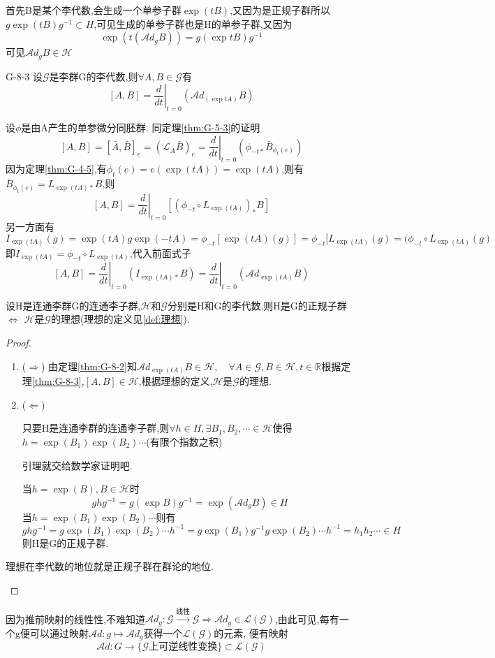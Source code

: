 \documentclass[../main.tex]{subfiles}
\begin{document}
首先B是某个李代数,会生成一个单参子群$\exp(tB)$,又因为是正规子群所以$g\exp(tB)g^{-1}\subset H$,可见生成的单参子群也是H的单参子群,又因为$$
	\exp(t (\mathscr{A}\!d_g B)) = g(\exp tB)g^{-1}$$
可见$\mathscr{A}\!d_gB \in \mathscr{H}$
\begin{theorem}{}{G-8-3}
	设$\mathscr{G}$是李群G的李代数,则$\forall A,B \in \mathscr{G}$有$$
		[A,B] = \left.\frac{d}{dt}\right|_{t=0} (\mathscr{A}\!d_{(\exp tA)}B)$$
\end{theorem}
设$\phi$是由A产生的单参微分同胚群.
同定理\ref{thm:G-5-3}的证明$$
	[A,B] = [\bar{A},\bar{B}]_e = (\mathscr{L}_{\bar{A}}\bar{B})_e = \left.\frac{d}{dt}\right|_{t=0}(\phi_{-t*}\bar{B}_{\phi_{t}(e)})$$
因为定理\ref{thm:G-4-5},有$\phi_t(e) = e (\exp(tA)) = \exp(tA)$,则有$\bar{B}_{\phi_t(e)} = L_{\exp(tA)*}B$,则$$
	[A,B] = \left.\frac{d}{dt}\right|_{t=0}[(\phi_{-t} \circ L_{\exp(tA)})_{*}B]$$
另一方面有$$
	I_{\exp (tA)}(g) = \exp(tA) g \exp(-tA) = \phi_{-t}[\exp (tA)(g)] = \phi_{-t}[L_{\exp(tA)}(g) = (\phi_{-t}\circ L_{\exp(tA)}(g)$$
即$I_{\exp(tA)} = \phi_{-t}\circ L_{\exp (tA)}$,代入前面式子$$
	[A,B] = \left.\frac{d}{dt}\right|_{t=0}(I_{\exp(tA)*}B) = \left.\frac{d}{dt}\right|_{t=0}(\mathscr{A}\!d_{\exp(tA)}B)$$
\begin{theorem}
	设H是连通李群G的连通李子群,$\mathscr{H}$和$\mathscr{G}$分别是H和G的李代数,则H是G的正规子群$\Leftrightarrow$ $\mathscr{H}$是$\mathscr{G}$的理想(理想的定义见\ref{def:理想}).
\end{theorem}
\begin{proof}
	\begin{enumerate}
		\item ($\Rightarrow$) 由定理\ref{thm:G-8-2}知$\mathscr{A}\!d_{\exp(tA)}B \in \mathscr{H},\quad \forall A \in \mathscr{G} ,B\in \mathscr{H}, t \in \mathbb{R}$根据定理\ref{thm:G-8-3},$[A,B] \in \mathscr{H}$,根据理想的定义,$\mathscr{H}$是$\mathscr{G}$的理想.
		\item ($\Leftarrow$) \begin{lemma}
			      只要H是连通李群的连通李子群,则$\forall h \in H,\exists B_1,B_2,\cdots \in \mathscr{H}$使得$h = \exp(B_1)\exp(B_2)\cdots$(有限个指数之积)
		      \end{lemma}引理就交给数学家证明吧.

		      当$h = \exp(B),B\in \mathscr{H}$时$$
			      ghg^{-1} = g(\exp{B})g^{-1} = \exp(\mathscr{A}\!d_gB) \in H$$当$h = \exp(B_1) \exp(B_2) \cdots$则有$$
			      ghg^{-1} = g\exp(B_1) \exp(B_2)\cdots h^{-1} = g\exp(B_1) g^{-1}g\exp(B_2)\cdots h^{-1} = h_1 h_2 \cdots \in H$$则H是G的正规子群.
	\end{enumerate}
	\begin{note}
		理想在李代数的地位就是正规子群在群论的地位.
	\end{note}
\end{proof}
因为推前映射的线性性,不难知道$\mathscr{A}\!d_g:\mathscr{G}\xrightarrow{\text{线性}} \mathscr{G} \Rightarrow \mathscr{A}\!d_g\in \mathscr{L}(\mathscr{G})$,由此可见,每有一个g便可以通过映射$\mathscr{A}\!d:g\mapsto \mathscr{A}\!d_g$获得一个$\mathscr{L}(\mathscr{G})$的元素,
便有映射$$
	\mathscr{A}\!d:G\rightarrow \{\mathscr{G}\text{上可逆线性变换}\} \subset \mathscr{L}(\mathscr{G})$$
\end{document}
